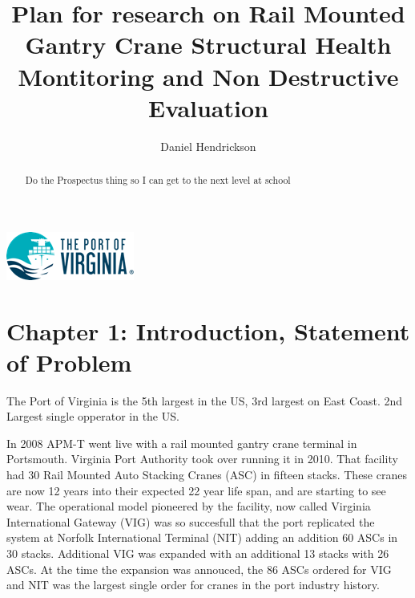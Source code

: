 \documentclass[journal=jacsat,manuscript=article]{achemso}
\author{Daniel Hendrickson}
\affiliation[Port of Virginia]
{Vice President Asset Management, Virginia Port Authority, Norfolk, VA}
\title[Research Prospecutus]
  {Plan for research on Rail Mounted Gantry Crane Structural Health Montitoring and Non Destructive Evaluation}
\begin{document}
\begin{tocentry}

\includegraphics{Figures/PortLogo}

\end{tocentry}

\begin{abstract}
 
Do the Prospectus thing so I can get to the next level at school
  

\end{abstract}
\pagebreak



\pagebreak
\section{Chapter 1: Introduction, Statement of Problem}
The Port of Virginia is the 5th largest in the US, 3rd largest on East Coast.  2nd Largest single opperator in the US.

In 2008 APM-T went live with a rail mounted gantry crane terminal in Portsmouth.  Virginia Port Authority took over running it in 2010.  That facility had 30 Rail Mounted Auto Stacking Cranes (ASC) in fifteen stacks.  These cranes are now 12 years into their expected 22 year life span, and are starting to see wear.  The operational model pioneered by the facility, now called Virginia International Gateway (VIG) was so succesfull that the port replicated the system at Norfolk International Terminal (NIT) adding an addition 60 ASCs in 30 stacks.  Additional VIG was expanded with an additional 13 stacks with 26 ASCs.  At the time the expansion was annouced, the 86 ASCs ordered for VIG and NIT was the largest single order for cranes in the port industry history.
\end{document}

